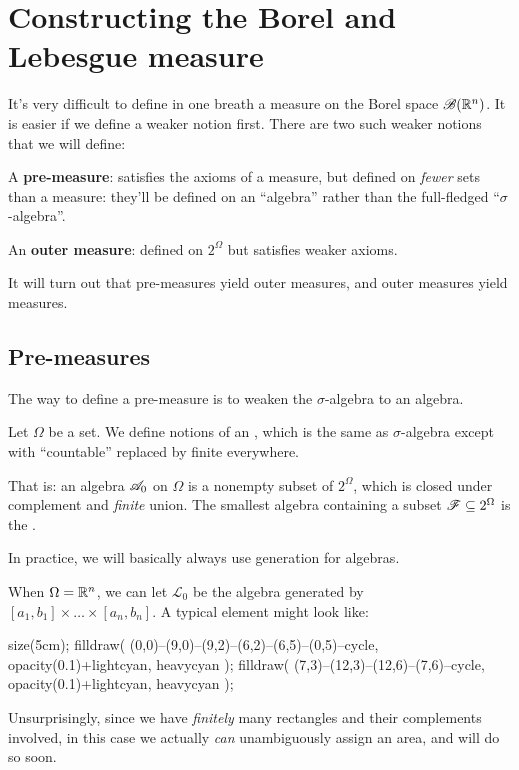 \chapter{Constructing the Borel and Lebesgue measure}
It's very difficult to define in one breath a measure
on the Borel space $\mathscr B(\mathbb R^n)$.
It is easier if we define a weaker notion first.
There are two such weaker notions that we will define:
\begin{itemize}
	\ii A \textbf{pre-measure}:
	satisfies the axioms of a measure,
	but defined on \emph{fewer} sets than a measure:
	they'll be defined on an ``algebra''
	rather than the full-fledged ``$\sigma$-algebra''.

	\ii An \textbf{outer measure}:
	defined on $2^\Omega$ but satisfies weaker axioms.
\end{itemize}
It will turn out that pre-measures yield outer measures,
and outer measures yield measures.


\section{Pre-measures}
The way to define a pre-measure is to weaken
the $\sigma$-algebra to an algebra.
\begin{definition}
	Let $\Omega$ be a set.
	We define notions of an ,
	which is the same as $\sigma$-algebra except
	with ``countable'' replaced by finite everywhere.

	That is: an algebra $\mathscr A_0$ on $\Omega$ is a
	nonempty subset of $2^\Omega$,
	which is closed under complement and \emph{finite} union.
	The smallest algebra containing a subset $\mathscr F \subseteq 2^\Omega$
	is the .
\end{definition}
In practice, we will basically always use generation for algebras.
\begin{example}
	When $\Omega = \mathbb R^n$,
	we can let $\mathcal{L}_0$ be the algebra generated by
	$[a_1, b_1] \times \dots \times [a_n, b_n]$.
	A typical element might look like:
	\begin{center}
	\begin{asy}
		size(5cm);
		filldraw( (0,0)--(9,0)--(9,2)--(6,2)--(6,5)--(0,5)--cycle,
			opacity(0.1)+lightcyan, heavycyan );
		filldraw( (7,3)--(12,3)--(12,6)--(7,6)--cycle,
			opacity(0.1)+lightcyan, heavycyan );
	\end{asy}
	\end{center}
	Unsurprisingly, since we have \emph{finitely} many
	rectangles and their complements involved,
	in this case we actually \emph{can}
	unambiguously assign an area, and will do so soon.
\end{example}


